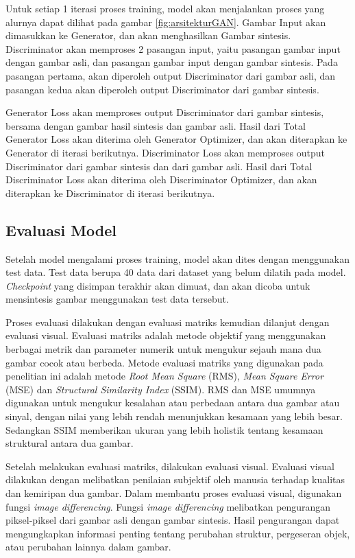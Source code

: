 Untuk setiap 1 iterasi proses training, model akan menjalankan proses yang alurnya dapat dilihat pada gambar \ref{fig:arsitekturGAN}. 
Gambar Input akan dimasukkan ke Generator, dan akan menghasilkan Gambar sintesis. 
Discriminator akan memproses 2 pasangan input, yaitu pasangan gambar input dengan gambar asli, dan pasangan gambar input dengan gambar sintesis. 
Pada pasangan pertama, akan diperoleh output Discriminator dari gambar asli, dan pasangan kedua akan diperoleh output Discriminator dari gambar sintesis. 

Generator Loss akan memproses output Discriminator dari gambar sintesis, bersama dengan gambar hasil sintesis dan gambar asli. 
Hasil dari Total Generator Loss akan diterima oleh Generator Optimizer, dan akan diterapkan ke Generator di iterasi berikutnya. 
Discriminator Loss akan memproses output Discriminator dari gambar sintesis dan dari gambar asli. 
Hasil dari Total Discriminator Loss akan diterima oleh Discriminator Optimizer, dan akan diterapkan ke Discriminator di iterasi berikutnya.

\subsection{Evaluasi Model}
\label{subsec:evaluasi}

Setelah model mengalami proses training, model akan dites dengan menggunakan test data. 
Test data berupa 40 data dari dataset yang belum dilatih pada model. 
\emph{Checkpoint} yang disimpan terakhir akan dimuat, dan akan dicoba untuk mensintesis gambar menggunakan test data tersebut. 

Proses evaluasi dilakukan dengan evaluasi matriks kemudian dilanjut dengan evaluasi visual. 
Evaluasi matriks adalah metode objektif yang menggunakan berbagai metrik dan parameter numerik untuk mengukur sejauh mana dua gambar cocok atau berbeda. 
Metode evaluasi matriks yang digunakan pada penelitian ini adalah metode \emph{Root Mean Square} (RMS), \emph{Mean Square Error} (MSE) dan \emph{Structural Similarity Index} (SSIM). 
RMS dan MSE umumnya digunakan untuk mengukur kesalahan atau perbedaan antara dua gambar atau sinyal, dengan nilai yang lebih rendah menunjukkan kesamaan yang lebih besar. 
Sedangkan SSIM memberikan ukuran yang lebih holistik tentang kesamaan struktural antara dua gambar.

Setelah melakukan evaluasi matriks, dilakukan evaluasi visual. 
Evaluasi visual dilakukan dengan melibatkan penilaian subjektif oleh manusia terhadap kualitas dan kemiripan dua gambar. 
Dalam membantu proses evaluasi visual, digunakan fungsi \emph{image differencing}. 
Fungsi \emph{image differencing} melibatkan pengurangan piksel-piksel dari gambar asli dengan gambar sintesis. 
Hasil pengurangan dapat mengungkapkan informasi penting tentang perubahan struktur, pergeseran objek, atau perubahan lainnya dalam gambar.

